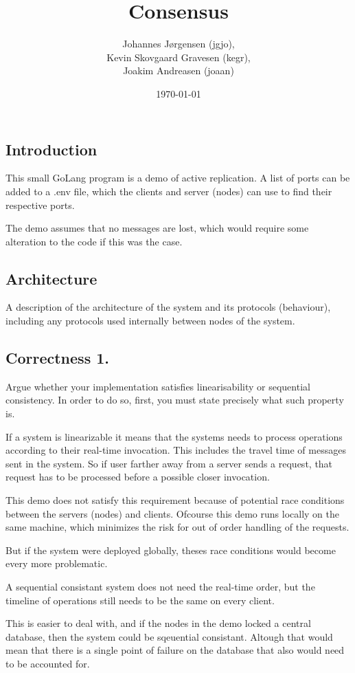 \documentclass[a4paper,11pt]{article}
\title{Consensus}
\author{Johannes Jørgensen (jgjo),\\ Kevin Skovgaard Gravesen (kegr),\\ Joakim Andreasen (joaan)}
\date{\today}
\begin{document}
 

\maketitle

\subsection{Introduction}
This small GoLang program is a demo of active replication. A list of ports can be added to a .env file,
which the clients and server (nodes) can use to find their respective ports.

The demo assumes that no messages are lost, which would require some alteration to the code if this was the case.

\subsection{Architecture}
A description of the architecture of the system and its protocols (behaviour), including any protocols used internally between nodes of the system. 
\subsection{Correctness 1.}
Argue whether your implementation satisfies linearisability or sequential consistency. In order to do so, first, you must state precisely what such property is.

If a system is linearizable it means that the systems needs to process operations according to their real-time invocation.
This includes the travel time of messages sent in the system. So if user farther away from a server sends a request,
that request has to be processed before a possible closer invocation.

This demo does not satisfy this requirement because of potential race conditions between the servers (nodes) and clients.
Ofcourse this demo runs locally on the same machine, which minimizes the risk for out of order handling of the requests.

But if the system were deployed globally, theses race conditions would become every more problematic.


A sequential consistant system does not need the real-time order, but the timeline of operations still needs to be the same on every client.

This is easier to deal with, and if the nodes in the demo locked a central database, then the system could be sqeuential consistant.
Altough that would mean that there is a single point of failure on the database that also would need to be accounted for.
\end{document}

